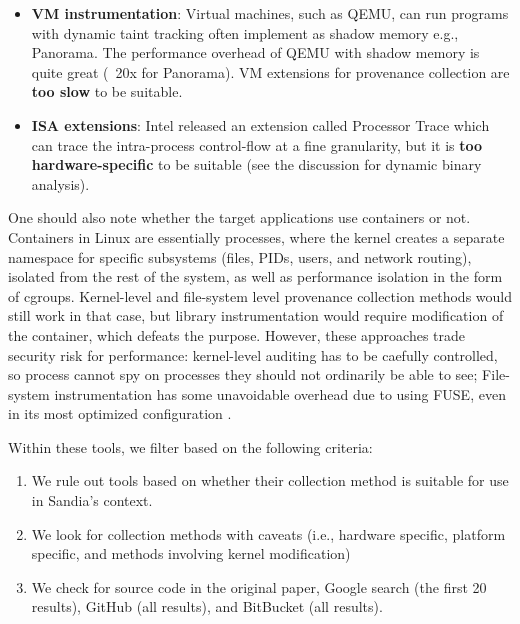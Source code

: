 \begin{itemize}
\item \textbf{VM instrumentation}:
Virtual machines, such as QEMU, can run programs with dynamic taint tracking often implement as shadow memory e.g., Panorama\cite{yin_panorama_2007}.
The performance overhead of QEMU with shadow memory is quite great (~20x for Panorama).
VM extensions for provenance collection are \textbf{too slow} to be suitable.

\item \textbf{ISA extensions}:
Intel released an extension called Processor Trace \cite{kleen_intel_2015} which can trace the intra-process control-flow at a fine granularity, but it is \textbf{too hardware-specific} to be suitable (see the discussion for dynamic binary analysis).

\end{itemize}

One should also note whether the target applications use containers or not.
Containers in Linux are essentially processes, where the kernel creates a separate namespace for specific subsystems (files, PIDs, users, and network routing), isolated from the rest of the system, as well as performance isolation in the form of cgroups.
Kernel-level and file-system level provenance collection methods would still work in that case, but library instrumentation would require modification of the container, which defeats the purpose.
However, these approaches trade security risk for performance: kernel-level auditing has to be caefully controlled, so process cannot spy on processes they should not ordinarily be able to see; File-system instrumentation has some unavoidable overhead due to using FUSE, even in its most optimized configuration \cite{vangoor_fuse_2017}.

Within these tools, we filter based on the following criteria:

\begin{enumerate}
\item
We rule out tools based on whether their collection method is suitable for use in Sandia's context.

\item
We look for collection methods with caveats (i.e., hardware specific, platform specific, and methods involving kernel modification)

\item
We check for source code in the original paper, Google search (the first 20 results), GitHub (all results), and BitBucket (all results).
\end{enumerate}

